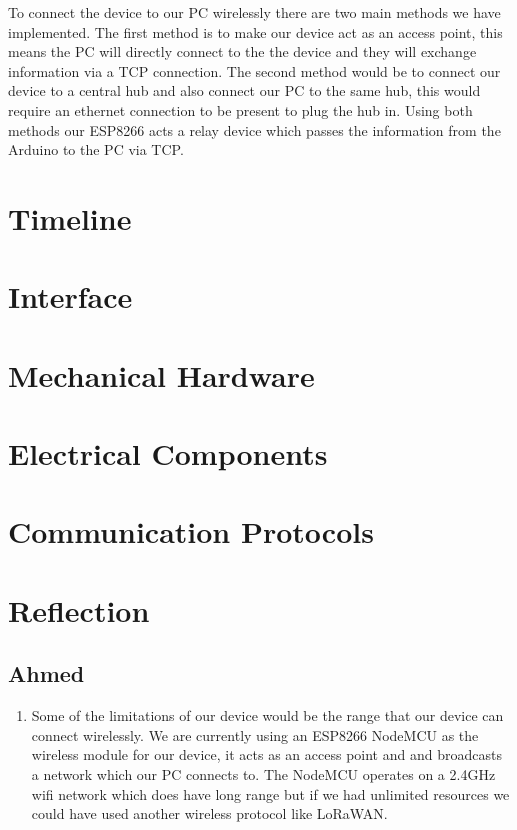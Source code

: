 \documentclass[12pt, titlepage]{article}
\begin{document}
To connect the device to our PC wirelessly there are two main methods we have implemented. The first method is to make our device act as an access point, this means the PC will directly connect to the the device and they will exchange information via a TCP connection. The second method would be to connect our device to a central hub and also connect our PC to the same hub, this would require an ethernet connection to be present to plug the hub in. Using both methods our ESP8266 acts a relay device which passes the information from the Arduino to the PC via TCP.



\section{Timeline}


% 

\newpage{}

\appendix

\section{Interface}


\section{Mechanical Hardware}

\section{Electrical Components}

\section{Communication Protocols}

\section{Reflection}
\subsection{Ahmed}
\begin{enumerate}
  \item Some of the limitations of our device would be the range that our device can connect wirelessly. We are currently using an ESP8266 NodeMCU as the wireless module for our device, it acts as an access point and and broadcasts a network which our PC connects to. The NodeMCU operates on a 2.4GHz wifi network which does have long range but if we had unlimited resources we could have used another wireless protocol like LoRaWAN.
  
\end{enumerate}
\end{document}
